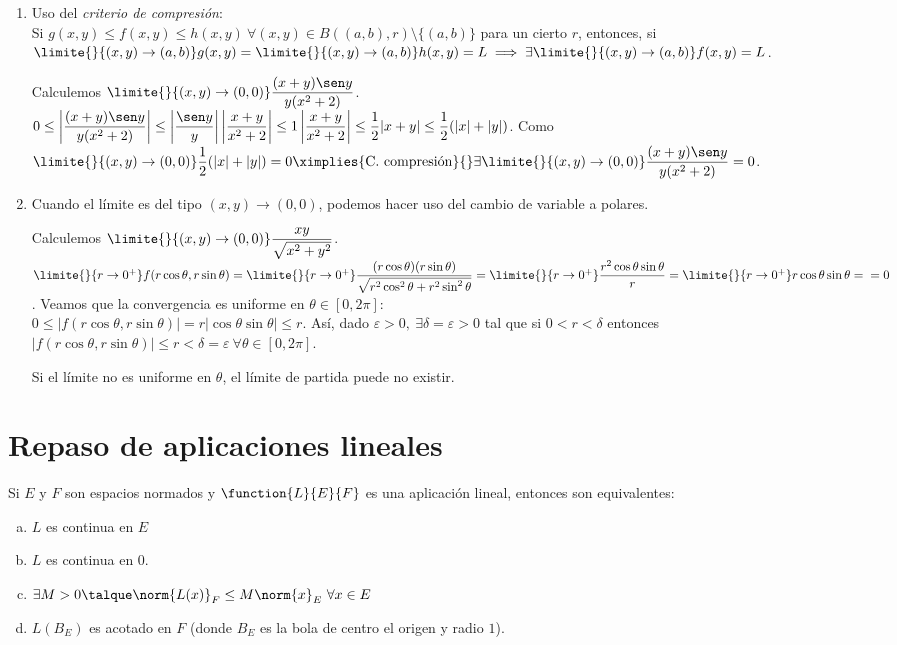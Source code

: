 \begin{enumerate}[1)]
\begin{ejem}
	\end{ejem}
	\item Uso del \textit{criterio de compresión}:\\
	Si $g(x,y)\leq f(x,y)\leq h(x,y)\ \forall(x,y)\in B((a,b),r)\setminus\{(a,b)\}$ para un cierto $r$, entonces, si $\limite{}{(x,y)\to(a,b)}g(x,y)=\limite{}{(x,y)\to(a,b)}h(x,y)=L\implies\exists\limite{}{(x,y)\to(a,b)}f(x,y)=L$.
	\begin{ejem} Calculemos $\limite{}{(x,y)\to(0,0)}\dfrac{(x+y)\sen y}{y(x^2+2)}$.\\
	$0\leq\left|\dfrac{(x+y)\sen y}{y(x^2+2)}\right|\leq \left|\dfrac{\sen y}{y}\right|\left|\dfrac{x+y}{x^2+2}\right|\leq 1\left|\dfrac{x+y}{x^2+2}\right|\leq \dfrac{1}{2}|x+y|\leq\dfrac{1}{2}(|x|+|y|)$. Como $\limite{}{(x,y)\to(0,0)}\dfrac{1}{2}(|x|+|y|)=0\ximplies{\mathrm{C.\ compresi\acute{o}n}}{}\exists \limite{}{(x,y)\to(0,0)}\dfrac{(x+y)\sen y}{y(x^2+2)}=0$.
	\end{ejem}
	\item Cuando el límite es del tipo $(x,y)\to(0,0)$, podemos hacer uso del cambio de variable a polares.
	\begin{ejem} Calculemos $\limite{}{(x,y)\to(0,0)}\dfrac{xy}{\sqrt{x^2+y^2}}$.\\
	$\limite{}{r\to0^+}f(r\cos\theta,r\sin\theta)=\limite{}{r\to0^+}\dfrac{(r\cos\theta)(r\sin\theta)}{\sqrt{r^2\cos^2\theta+r^2\sin^2\theta}}=\limite{}{r\to0^+}\dfrac{r^2\cos\theta\sin\theta}{r}=\limite{}{r\to0^+}r\cos\theta\sin\theta=\\
	=0$. Veamos que la convergencia es uniforme en $\theta\in[0,2\pi]$:\\
	$0\leq |f(r\cos\theta,r\sin\theta)|=r|\cos\theta\sin\theta|\leq r$. Así, dado $\varepsilon>0,\ \exists\delta=\varepsilon>0$ tal que si $0<r<\delta$ entonces $|f(r\cos\theta,r\sin\theta)|\leq r<\delta=\varepsilon\ \forall\theta\in[0,2\pi]$.
	\end{ejem}
	\begin{nota}Si el límite no es uniforme en $\theta$, el límite de partida puede no existir.\end{nota}
	\end{enumerate}
	
	
	\chapter{Repaso de aplicaciones lineales} \label{App:AppendixB}	
	
	\begin{proposicion} Si $E$ y $F$ son espacios normados y $\function{L}{E}{F}$ es una aplicación lineal, entonces son equivalentes:
	\begin{enumerate}[a)]
	\item $L$ es continua en $E$
	\item $L$ es continua en $0$.
	\item $\exists M>0	\talque \norm{L(x)}_F\leq M\norm{x}_E\ \forall x\in E$
	\item $L(B_E)$ es acotado en $F$ (donde $B_E$ es la bola de centro el origen y radio $1$).
	\end{enumerate}
	\end{proposicion}
	
